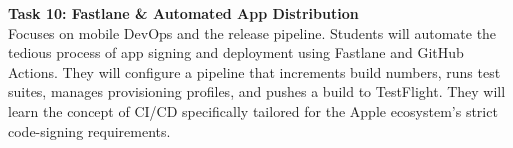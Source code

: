 \vspace{0.3cm}

\noindent\textbf{Task 10: Fastlane \& Automated App Distribution} \\
Focuses on mobile DevOps and the release pipeline. Students will automate the tedious process of app signing and deployment using Fastlane and GitHub Actions. They will configure a pipeline that increments build numbers, runs test suites, manages provisioning profiles, and pushes a build to TestFlight. They will learn the concept of CI/CD specifically tailored for the Apple ecosystem's strict code-signing requirements.

\newpage
{}